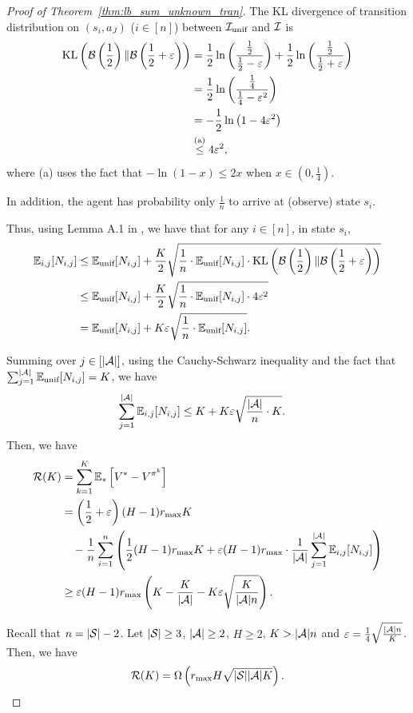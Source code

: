 \begin{proof}[Proof of Theorem~\ref{thm:lb_sum_unknown_tran}]
	The KL divergence of transition distribution on $(s_i,a_J)$ ($i \in [n]$) between $\mathcal{I}_{\textup{unif}}$ and $\mathcal{I}$ is 
	\begin{align*}
		\textup{KL} \left(  \mathcal{B}\left( \frac{1}{2} \right) \| \mathcal{B}\left( \frac{1}{2}+\varepsilon \right)  \right) &=  \frac{1}{2} \ln\left( \frac{\frac{1}{2}}{\frac{1}{2}-\varepsilon} \right) + \frac{1}{2}\ln\left(  \frac{\frac{1}{2}}{\frac{1}{2}+\varepsilon}  \right) 
		\\
		&=  \frac{1}{2} \ln\left( \frac{\frac{1}{4}}{\frac{1}{4}-\varepsilon^2} \right) 
		\\
		&=  -\frac{1}{2} \ln\left( 1-4\varepsilon^2 \right) 
		\\
		&\overset{\textup{(a)}}{\leq} 4 \varepsilon^2 ,
	\end{align*}
	where (a) uses the fact that  $-\ln(1-x)\leq 2 x$ when $x \in (0,\frac{1}{4})$.
	
	In addition, the agent has probability only $\frac{1}{n}$ to arrive at (observe) state $s_i$.
	
	Thus, using Lemma A.1 in \cite{auer2002nonstochastic}, we have that for any $i \in [n]$, in state $s_i$,
	\begin{align*}
		\mathbb{E}_{i,j}[N_{i,j}] &\leq \mathbb{E}_{\textup{unif}}[N_{i,j}] + \frac{K}{2} \sqrt{ \frac{1}{n} \cdot \mathbb{E}_{\textup{unif}}[N_{i,j}] \cdot \textup{KL} \left(  \mathcal{B}\left( \frac{1}{2} \right) \| \mathcal{B}\left( \frac{1}{2}+\varepsilon \right)  \right) } 
		\\
		&\leq \mathbb{E}_{\textup{unif}}[N_{i,j}] + \frac{K}{2} \sqrt{ \frac{1}{n} \cdot \mathbb{E}_{\textup{unif}}[N_{i,j}] \cdot 4 \varepsilon^2 }
		\\
		&= \mathbb{E}_{\textup{unif}}[N_{i,j}] + K \varepsilon \sqrt{ \frac{1}{n} \cdot \mathbb{E}_{\textup{unif}}[N_{i,j}] } .
	\end{align*}
	
	Summing over $j \in [|\mathcal{A}|]$, using the Cauchy-Schwarz inequality and the fact that $\sum_{j=1}^{|\mathcal{A}|} \mathbb{E}_{\textup{unif}}[N_{i,j}]=K$, we have
	\begin{align*}
		\sum_{j=1}^{|\mathcal{A}|}  \mathbb{E}_{i,j}[N_{i,j}] &\leq K + K \varepsilon \sqrt{ \frac{|\mathcal{A}|}{n} \cdot K  } .
	\end{align*}
	Then, we have
	\begin{align*}
		\mathcal{R}(K) &= \sum_{k=1}^{K} \mathbb{E}_{*}\left[ V^*-V^{\pi^k} \right]
		\\
		&=\left( \frac{1}{2}+\varepsilon \right)(H-1)r_{\max}K 
		\\
		&\quad - \frac{1}{n} \sum_{i=1}^{n} \left(  \frac{1}{2}(H-1)r_{\max}K + \varepsilon(H-1)r_{\max} \cdot \frac{1}{|\mathcal{A}|} \sum_{j=1}^{|\mathcal{A}|} \mathbb{E}_{i,j}[N_{i,j}]  \right)
		\\
		&\geq \varepsilon(H-1)r_{\max} \left( K - \frac{K}{|\mathcal{A}|} - K \varepsilon \sqrt{ \frac{K}{|\mathcal{A}|n} }  \right) .
	\end{align*}
	
	Recall that $n=|\mathcal{S}|-2$. Let $|\mathcal{S}|\geq 3$, $|\mathcal{A}|\geq 2$, $H \geq 2$, $K > |\mathcal{A}|n$ and $\varepsilon=\frac{1}{4}\sqrt{\frac{|\mathcal{A}|n}{K}}$. Then, we have 
	\begin{align*}
		\mathcal{R}(K) = \Omega\left(  r_{\max} H\sqrt{|\mathcal{S}||\mathcal{A}|K}  \right) .
	\end{align*}
\end{proof}


